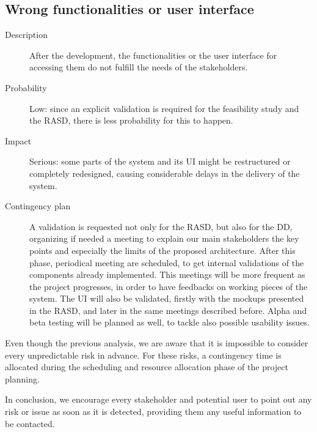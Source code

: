 \subsection*{Wrong functionalities or user interface}
	\begin{description}
		\item[Description] After the development, the functionalities or the user interface for accessing them do not fulfill the needs of the stakeholders.
		\item[Probability] Low: since an explicit validation is required for the feasibility study and the RASD, there is less probability for this to happen.
		\item[Impact] Serious: some parts of the system and its UI might be restructured or completely redesigned, causing considerable delays in the delivery of the system.
		\item[Contingency plan] A validation is requested not only for the RASD, but also for the DD, organizing if needed a meeting to explain our main stakeholders the key points and especially the limits of the proposed architecture. After this phase, periodical meeting are scheduled, to get internal validations of the components already implemented. This meetings will be more frequent as the project progresses, in order to have feedbacks on working pieces of the system.\newline
		The UI will also be validated, firstly with the mockups presented in the RASD, and later in the same meetings described before.\newline
		Alpha and beta testing will be planned as well, to tackle also possible usability issues.
	\end{description}

Even though the previous analysis, we are aware that it is impossible to consider every unpredictable risk in advance. For these risks, a contingency time is allocated during the scheduling and resource allocation phase of the project planning.

In conclusion, we encourage every stakeholder and potential user to point out any risk or issue as soon as it is detected, providing them any useful information to be contacted.

